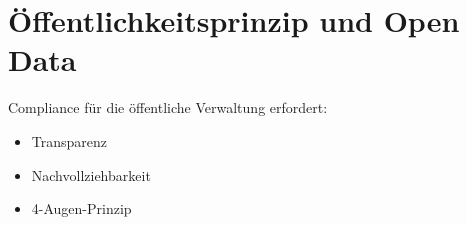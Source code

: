 \hypertarget{uxf6ffentlichkeitsprinzip-und-open-data}{%
\section{Öffentlichkeitsprinzip und Open
Data}\label{uxf6ffentlichkeitsprinzip-und-open-data}}

Compliance für die öffentliche Verwaltung erfordert:

\begin{itemize}
\tightlist
\item
  Transparenz
\item
  Nachvollziehbarkeit
\item
  4-Augen-Prinzip
\end{itemize}
